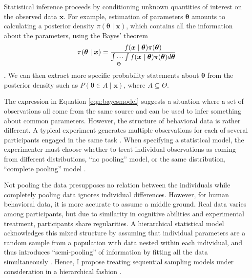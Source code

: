 \documentclass[12pt]{report}
\begin{document}
Statistical inference proceeds by conditioning unknown quantities of interest on the observed data $\boldsymbol{x}$. For example, estimation of parameters $\boldsymbol{\theta}$ amounts to calculating a posterior density $\pi(\boldsymbol{\theta} \mid \boldsymbol{x})$, which contains all the information about the parameters, using the Bayes' theorem
% 
\begin{equation} 
\label{eqn:posterior}
\pi(\boldsymbol{\theta} \mid \boldsymbol{x}) = 
   \frac{f(\boldsymbol{x} \mid \boldsymbol{\theta}) \pi(\boldsymbol{\theta})} 
        {\idotsint\limits_\Theta f(\boldsymbol{x} \mid \boldsymbol{\theta})
         \pi(\boldsymbol{\theta})d\boldsymbol{\theta}}
\end{equation} 
% 
\citep{Ber1997,CasBer2002,Ber2011,GelCar2013}. We can then extract more specific probability statements about $\boldsymbol{\theta}$ from the posterior density such as $P(\boldsymbol{\theta} \in A \mid \boldsymbol{x})$, where $A \subseteq \Theta$. 

The expression in Equation \ref{eqn:bayesmodel} suggests a situation where a set of observations all come from the same source and can be used to infer something about common parameters. However, the structure of behavioral data is rather different. A typical experiment generates
multiple observations for each of several participants engaged in the
same task \citep{RatMck2008,Wag2009}. When specifying a statistical
model, the experimenter must choose whether to treat individual observations as coming from different distributions, ``no pooling'' model, or the same distribution, ``complete pooling'' model \citep{RouLu2005,RouLu22005,RouMor2014}. 

Not pooling the data presupposes no relation between the individuals while completely
pooling data ignores individual differences. However, for human
behavioral data, it is more accurate to assume a middle ground. Real
data varies among participants, but due to similarity in cognitive
abilities and experimental treatment, participants share regularities. A hierarchical statistical model acknowledges this mixed
structure by assuming that individual parameters are a random sample
from a population with data nested within each individual, and thus introduces
``semi-pooling'' of information by fitting all the data simultaneously \citep{GelCar2013}. Hence, I propose treating  sequential sampling models under consideration in a hierarchical fashion \citep{Ber1997,GelCar2013,RouLu2005,CraPer2010}. 
\end{document}
